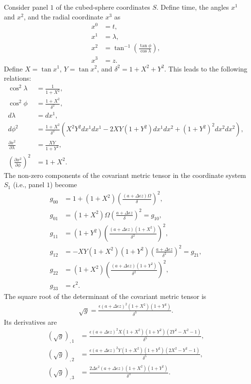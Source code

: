 \documentclass{article}
\begin{document}
Consider panel $1$ of the cubed-sphere coordinates $S$. Define time, the angles $x^1$ and $x^2$, and the radial coordinate $x^3$ as
\begin{align}
x^0&=t, \\
x^{1}&=\lambda, \\
x^{2}&=\tan^{-1} \left( \frac{\tan \phi}{\cos \lambda}\right), \\
x^{3}&=z.
\end{align}
Define $X=\tan x^1$, $Y=\tan x^2$, and $\delta^2=1+X^2+Y^2$. This leads to the following relations:
\begin{align}
\cos^2 \lambda&=\frac{1}{1+X^2}, \\
\cos^2 \phi&=\frac{1+X^2}{\delta^2}, \\
d\lambda&=dx^1, \\
d\phi^2&=\frac{1+X^2}{\delta^2} \left( X^2Y^2 dx^1 dx^1 -2XY(1+Y^2)dx^1dx^2 +(1+Y^2)^2dx^2dx^2  \right), \\
\frac{\partial x^2}{\partial \lambda}&=\frac{XY}{1+Y^2}, \\
\left( \frac{\partial x^2}{\partial \phi}\right)^2&=1+X^2.
\end{align}
The non-zero components of the covariant metric tensor in the coordinate system $S_1$ (i.e., panel $1$) become
\begin{align}
g_{00}&=1+(1+X^2) \left( \frac{(a+\Delta\epsilon z)\Omega}{\delta} \right)^2, \\
g_{01}&=(1+X^2) \Omega \left( \frac{a+\Delta\epsilon z}{\delta} \right)^2 =g_{10}, \\
g_{11}&=(1+Y^2) \left( \frac{(a+\Delta\epsilon z)(1+X^2)}{\delta^2} \right)^2, \\
g_{12}&=-XY(1+X^2)(1+Y^2) \left( \frac{a+\Delta\epsilon z}{\delta^2} \right)^2 = g_{21}, \\
g_{22}&=(1+X^2) \left( \frac{(a+\Delta\epsilon z)(1+Y^2)}{\delta^2} \right)^2, \\
g_{33}&=\epsilon^2.
\end{align}
The square root of the determinant of the covariant metric tensor is
\begin{align}
\sqrt{g}=\frac{\epsilon (a+\Delta\epsilon z)^2 (1+X^2)(1+Y^2)}{\delta^3}.
\end{align}
Its derivatives are
\begin{align}
(\sqrt{g})_{,1}&=\frac{\epsilon (a+\Delta\epsilon z)^2 X(1+X^2)(1+Y^2)(2Y^2-X^2-1)}{\delta^5}, \\
(\sqrt{g})_{,2}&=\frac{\epsilon (a+\Delta\epsilon z)^2 Y(1+X^2)(1+Y^2)(2X^2-Y^2-1)}{\delta^5}, \\
(\sqrt{g})_{,3}&=\frac{2\Delta \epsilon^2 (a+\Delta\epsilon z) (1+X^2)(1+Y^2)}{\delta^3}.
\end{align}
\end{document}
